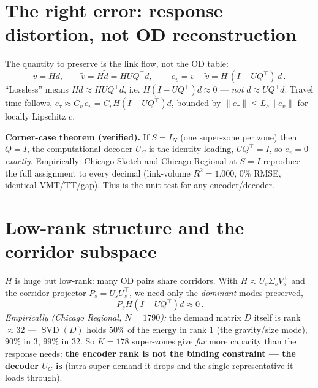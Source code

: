 \documentclass[11pt]{article}
\begin{document}
\section{The right error: response distortion, not OD reconstruction}
The quantity to preserve is the link flow, not the OD table:
\[
v=Hd,\qquad \tilde v = H\tilde d = HUQ^{\!\top}d,\qquad
\boxed{\,e_v = v-\tilde v = H\,(I-UQ^{\!\top})\,d\,}.
\]
``Lossless'' means $Hd\approx HUQ^{\!\top}d$, i.e. $H(I-UQ^{\!\top})d\approx0$ ---
\emph{not} $d\approx UQ^{\!\top}d$. Travel time follows,
$e_\tau\approx C_v\,e_v = C_vH(I-UQ^{\!\top})d$, bounded by
$\lVert e_\tau\rVert\le L_c\lVert e_v\rVert$ for locally Lipschitz $c$.

\begin{keybox}
\textbf{Corner-case theorem (verified).} If $S=I_N$ (one super-zone per zone) then
$Q=I$, the computational decoder $U_C$ is the identity loading, $UQ^{\!\top}=I$, so
$e_v=0$ \emph{exactly}. Empirically: Chicago Sketch and Chicago Regional at $S=I$
reproduce the full assignment to every decimal (link-volume $R^2=1.000$, $0\%$
RMSE, identical VMT/TT/gap). This is the unit test for any encoder/decoder.
\end{keybox}

\section{Low-rank structure and the corridor subspace}
$H$ is huge but low-rank: many OD pairs share corridors. With
$H\approx U_s\Sigma_sV_s^{\!\top}$ and the corridor projector $P_s=U_sU_s^{\!\top}$,
we need only the \emph{dominant} modes preserved,
\[
\boxed{\,P_sH(I-UQ^{\!\top})d\approx0\,}.
\]
\textit{Empirically (Chicago Regional, $N=1790$):} the demand matrix $D$ itself is
rank $\approx 32$ --- $\operatorname{SVD}(D)$ holds $50\%$ of the energy in rank $1$
(the gravity/size mode), $90\%$ in $3$, $99\%$ in $32$. So $K=178$ super-zones give
\emph{far} more capacity than the response needs: \textbf{the encoder rank is not the
binding constraint --- the decoder $U_C$ is} (intra-super demand it drops and the
single representative it loads through).
\end{document}
